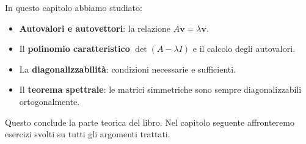 \begin{notebox}
In questo capitolo abbiamo studiato:
\begin{itemize}
    \item \textbf{Autovalori e autovettori}: la relazione $A\mathbf{v} = \lambda\mathbf{v}$.
    \item Il \textbf{polinomio caratteristico} $\det(A - \lambda I)$ e il calcolo degli autovalori.
    \item La \textbf{diagonalizzabilità}: condizioni necessarie e sufficienti.
    \item Il \textbf{teorema spettrale}: le matrici simmetriche sono sempre diagonalizzabili ortogonalmente.
\end{itemize}
Questo conclude la parte teorica del libro. Nel capitolo seguente affronteremo esercizi svolti su tutti gli argomenti trattati.
\end{notebox}
